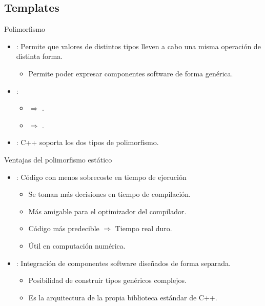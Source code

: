\subsection{Templates}

\begin{frame}[t]{Polimorfismo}
\begin{itemize}
  \item {}: Permite que valores de distintos tipos
        lleven a cabo una misma operación de distinta forma.
    \begin{itemize}
      \item Permite poder expresar componentes software de forma genérica.
    \end{itemize}

  \vfill\pause
  \item {}:
    \begin{itemize}
      \item {} $\Rightarrow$ 
            .
      \item {} $\Rightarrow$
            .
    \end{itemize}

  \vfill\pause
  \item {}: C++ soporta los dos tipos de polimorfismo.
\end{itemize}
\end{frame}

\begin{frame}[t]{Ventajas del polimorfismo estático}
\begin{itemize}
  \item {}: Código con menos sobrecoste en tiempo de ejecución
    \begin{itemize}
      \item Se toman más decisiones en tiempo de compilación.
      \item Más amigable para el optimizador del compilador.
      \item Código más predecible $\Rightarrow$ Tiempo real duro.
      \item Útil en computación numérica.
    \end{itemize}

  \vfill\pause
  \item {}: Integración de componentes software diseñados
        de forma separada.
    \begin{itemize}
      \item Posibilidad de construir tipos genéricos complejos.
      \item Es la arquitectura de la propia biblioteca estándar de C++.
    \end{itemize}
\end{itemize}
\end{frame}

